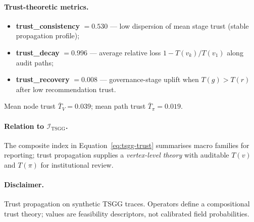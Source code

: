 \paragraph{Trust-theoretic metrics.}
\begin{itemize}[noitemsep]
  \item \textbf{trust\_consistency} $=0.530$ --- low dispersion of
        mean stage trust (stable propagation profile);
  \item \textbf{trust\_decay} $=0.996$ --- average relative loss
        $1-T(v_k)/T(v_1)$ along audit paths;
  \item \textbf{trust\_recovery} $=0.008$ --- governance-stage uplift
        when $T(g)>T(r)$ after low recommendation trust.
\end{itemize}
Mean node trust $\bar{T}_V=0.039$;
mean path trust $\bar{T}_\pi=0.019$.




\paragraph{Relation to $\mathcal{I}_{\mathrm{TSGG}}$.}
The composite index in Equation~\eqref{eq:tsgg-trust} summarises macro families for
reporting; trust propagation supplies a \emph{vertex-level theory} with auditable
$T(v)$ and $T(\pi)$ for institutional review.

\paragraph{Disclaimer.}
Trust propagation on synthetic TSGG traces. Operators define a compositional trust theory; values are feasibility descriptors, not calibrated field probabilities.
